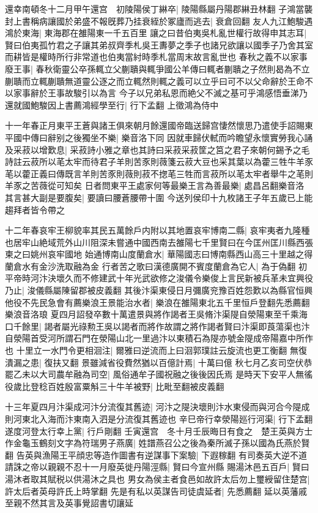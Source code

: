 還幸南頓冬十二月甲午還宫　初陵陽侯丁綝卒|{
	陵陽縣屬丹陽郡綝丑林翻}
子鴻當襲封上書稱病讓國於弟盛不報旣葬乃挂衰絰於冢廬而逃去|{
	衰倉回翻}
友人九江鮑駿遇鴻於東海|{
	東海郡在雒陽東一千五百里}
讓之曰昔伯夷吳札亂世權行故得申其志耳|{
	賢曰伯夷孤竹君之子讓其弟叔齊季札吳王夀夢之季子也諸兄欲讓以國季子乃舍其室而耕皆是權時所行非常道也伯夷當紂時季札當周末故言亂世也}
春秋之義不以家事廢王事|{
	春秋衛靈公卒孫輒立父蒯聵與輒爭國公羊傳曰輒者蒯聵之子然則曷為不立蒯聵而立輒蒯聵無道靈公逐之而立輒然則輒之義可以立乎曰可不以父命辭於王命不以家事辭於王事故駿引以為言}
今子以兄弟私恩而絶父不滅之基可乎鴻感悟垂涕乃還就國鮑駿因上書薦鴻經學至行|{
	行下孟翻}
上徵鴻為侍中

十一年春正月東平王蒼與諸王俱來朝月餘還國帝臨送歸宫悽然懷思乃遣使手詔賜東平國中傳曰辭别之後獨坐不樂|{
	樂音洛下同}
因就車歸伏軾而吟瞻望永懷實勞我心誦及采菽以增歎息|{
	采菽詩小雅之章也其詩曰采菽采菽筐之筥之君子來朝何錫予之毛詩註云菽所以芼太牢而待君子羊則苦豕則薇箋云菽大豆也采其葉以為藿三牲牛羊豕芼以藿正義曰傳既言羊則苦豕則薇則菽不揔芼三牲而言菽所以芼太牢者舉牛之芼則羊豕之苦薇從可知矣}
日者問東平王處家何等最樂王言為善最樂|{
	處昌呂翻樂音洛}
其言甚大副是要腹矣|{
	要讀曰腰蒼腰帶十圍}
今送列侯印十九枚諸王子年五歲已上能趨拜者皆令帶之

十二年春哀牢王柳貌率其民五萬餘戶内附以其地置哀牢博南二縣|{
	哀牢夷者九隆種也居牢山絶域荒外山川阻深未嘗通中國西南去雒陽七千里賢曰在今匡州匡川縣西張柬之曰姚州哀牢國地}
始通博南山度蘭倉水|{
	華陽國志曰博南縣西山高三十里越之得蘭倉水有金沙洗取融為金}
行者苦之歌曰漢德廣開不賓度蘭倉為它人|{
	為于偽翻}
初平帝時河汴決壞久而不修建武十年光武欲修之浚儀令樂俊上言民新被兵革未宜興役乃止|{
	浚儀縣屬陳留郡被皮義翻}
其後汴渠東侵日月彌廣兖豫百姓怨歎以為縣官恒興他役不先民急會有薦樂浪王景能治水者|{
	樂浪在雒陽東北五千里恒戶登翻先悉薦翻樂浪音洛琅}
夏四月詔發卒數十萬遣景與將作謁者王吳脩汴渠隄自滎陽東至千乘海口千餘里|{
	謁者屬光祿勲王吳以謁者而將作故謂之將作謁者賢曰汴渠即莨蕩渠也汴自滎陽首受河所謂石門在滎陽山北一里過汴以東積石為隄亦號金隄成帝陽嘉中所作也}
十里立一水門令更相洄注|{
	爾雅曰逆流而上曰洄郭璞註云旋流也更工衡翻}
無復潰漏之患|{
	復扶又翻}
景雖減省役費然猶以百億計焉|{
	十萬曰億}
秋七月乙亥司空伏恭罷乙未以大司農牟融為司空|{
	風俗通牟子國祝融之後後因氏焉}
是時天下安平人無徭役歲比登稔百姓殷富粟斛三十牛羊被野|{
	比毗至翻被皮義翻}


十三年夏四月汴渠成河汴分流復其舊迹|{
	河汴之隄決壞則汴水東侵而與河合今隄成則河東北入海而汴東南入泗是分流復其舊迹也}
辛巳帝行幸滎陽廵行河渠|{
	行下孟翻}
遂度河登太行幸上黨|{
	行戶剛翻}
壬寅還宫　冬十月壬辰晦日有食之　楚王英與方士作金龜玉鶴刻文字為符瑞男子燕廣|{
	姓譜燕召公之後為秦所滅子孫以國為氏燕於賢翻}
告英與漁陽王平顔忠等造作圖書有逆謀事下案驗|{
	下遐稼翻}
有司奏英大逆不道請誅之帝以親親不忍十一月廢英徙丹陽涇縣|{
	賢曰今宣州縣}
賜湯沐邑五百戶|{
	賢曰湯沐者取其賦税以供湯沐之具也}
男女為侯主者食邑如故許太后勿上璽綬留住楚宫|{
	許太后者英母許氏上時掌翻}
先是有私以英謀告司徒虞延者|{
	先悉薦翻}
延以英藩戚至親不然其言及英事覺詔書切讓延

